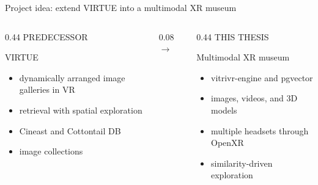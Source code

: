 \begin{frame}[c]{Project idea: extend VIRTUE into a multimodal XR museum}
\begin{columns}[T,onlytextwidth]
  \begin{column}{0.44\textwidth}
    \textcolor{unigrey}{\large PREDECESSOR}

    \vspace{0.12cm}
    \Large VIRTUE

    \vspace{0.15cm}
    \small
    \begin{itemize}
      \item dynamically arranged image galleries in VR
      \item retrieval with spatial exploration
      \item Cineast and Cottontail DB
      \item image collections
    \end{itemize}
  \end{column}
  \begin{column}{0.08\textwidth}
    \vspace{1.45cm}
    \centering
    \Huge$\rightarrow$
  \end{column}
  \begin{column}{0.44\textwidth}
    \textcolor{unimint}{\large THIS THESIS}

    \vspace{0.12cm}
    \Large Multimodal XR museum

    \vspace{0.15cm}
    \small
    \begin{itemize}
      \item vitrivr-engine and pgvector
      \item images, videos, and 3D models
      \item multiple headsets through OpenXR
      \item similarity-driven exploration
    \end{itemize}
  \end{column}
\end{columns}
\end{frame}
